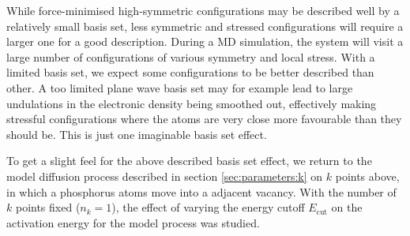 \documentclass[11pt,bibliography=totoc,index=totoc]{scrbook}   %
\begin{document}
While force-minimised high-symmetric configurations may be described well by a relatively small basis set,
less symmetric and stressed configurations will require a larger one for a good description. 
During a MD simulation, the system will visit a large number of configurations of various symmetry and local stress.
With a limited basis set, we expect some configurations to be better described than other. 
A too limited plane wave basis set may for example lead to large undulations in the electronic density being smoothed out, 
effectively making stressful configurations where the atoms are very close more favourable than they should be. 
This is just one imaginable basis set effect.

To get a slight feel for the above described basis set effect, we return to the model diffusion process described in section \ref{sec:parameters:k} on $k$ points above, in which a phosphorus atoms move into a adjacent vacancy. 
With the number of $k$ points fixed ($n_k=1$), the effect of varying the energy cutoff $E_{\text{cut}}$ on the activation energy for the model process was studied. 


\end{document}
